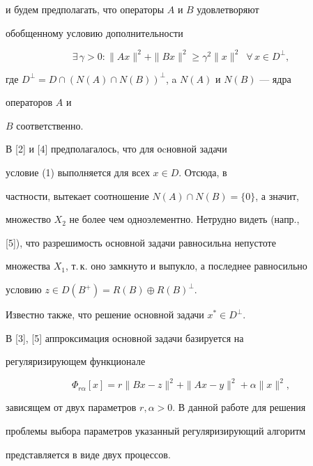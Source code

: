и будем предполагать, что операторы $A$ и $B$ удовлетворяют  


обобщенному условию дополнительности 


\begin{equation} 


\exists\,\gamma>0:\|Ax\|^2+\|B x\|^2\ge\gamma^2\|x\|^2\ \; 


\forall\,x\in D^\bot, 


\end{equation} 


где $D^\bot=D\cap(N(A)\cap N(B))^\bot$, a $N(A)$ и $N(B)$ --- ядра 


операторов $A$ и  


$B$ соответственно. 


 


В [2] и [4] предполагалось, что для оcновной задачи 


условие (1) выполняется для всех $x\in D$. Отсюда, в  


частности, вытекает соотношение $N(A)\cap N(B)=\{0\}$, а значит,  


множество $X_2$ не более чем одноэлементно. Нетрудно видеть (напр., 


[5]), что разрешимость основной задачи равносильна непустоте  


множества $X_1$, т.\,к. оно замкнуто и выпукло, а последнее равносильно  


условию $z\in D(B^+)=R(B)\oplus R(B)^\bot$. 


Известно также, что решение основной задачи $x^*\in D^\bot$. 


 


В [3], [5] аппроксимация основной задачи базируется на  


регуляризирующем функционале 


\begin{equation} 


\Phi_{r\alpha}[x]=r\|B x-z\|^2+\|Ax-y\|^2+\alpha\|x\|^2, 


\end{equation} 


зависящем от двух параметров $r,\alpha>0$. В данной работе для решения  


проблемы выбора параметров указанный регуляризирующий алгоритм  


представляется в виде двух процессов. 


 


